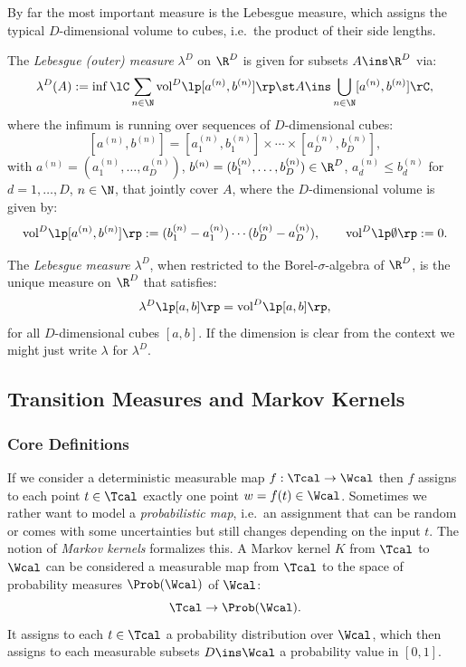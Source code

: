 By far the most important measure is the Lebesgue measure, which assigns the typical $D$-dimensional volume to cubes, i.e.\
the product of their side lengths.

\begin{Def}
    The \emph{Lebesgue (outer) measure} $\lambda^D$ on $\R^D$ is given for subsets $A \ins \R^D$ via:
    \[ \lambda^D(A) := \inf\lC \sum_{n \in \N} \mathrm{vol}^D\lp [a^{(n)},b^{(n)}] \rp  \st  
    A \ins \bigcup_{n \in \N} [a^{(n)},b^{(n)}]  \rC, \]
    where the infimum is running over sequences of $D$-dimensional cubes:
     \[ [a^{(n)},b^{(n)}] = [a_1^{(n)},b_1^{(n)}] \times \cdots \times [a_D^{(n)}, b_D^{(n)}],\]
  with $a^{(n)}=(a_1^{(n)},\dots,a_D^{(n)})$, $b^{(n)}=(b_1^{(n)},\dots,b_D^{(n)}) \in \R^D$, $a_d^{(n)} \le b_d^{(n)}$ for $d=1,\dots,D$, $n \in \N$, that jointly cover $A$, where the $D$-dimensional volume is given by:
  \[ \mathrm{vol}^D\lp [a^{(n)},b^{(n)}] \rp := (b_1^{(n)}-a_1^{(n)}) \cdots (b_D^{(n)}-a_D^{(n)}),\qquad \mathrm{vol}^D\lp \emptyset \rp :=0. \]
\end{Def}

\begin{Thm}
 The \emph{Lebesgue measure} $\lambda^D$, when restricted to the Borel-$\sigma$-algebra of $\R^D$,
  is the unique measure on $\R^D$ that satisfies:
    \[ \lambda^D\lp [a,b] \rp = \mathrm{vol}^D\lp [a,b] \rp,     \]
    for all $D$-dimensional cubes $[a,b]$.
    If the dimension is clear from the context we might just write $\lambda$ for $\lambda^D$.
\end{Thm}


\subsection{Transition Measures and Markov Kernels}

\subsubsection{Core Definitions}

\begin{Motivation}
 If we consider a deterministic measurable map $f: \Tcal \to \Wcal$ then $f$ assigns to each point $t \in \Tcal$ exactly one point $w=f(t) \in \Wcal$.
 Sometimes we rather want to model a \emph{probabilistic map}, i.e.\ an assignment that can be random or comes with some uncertainties but still changes depending on the input $t$. 
 The notion of \emph{Markov kernels} formalizes this. 
A Markov kernel $K$ from $\Tcal$ to $\Wcal$
can be considered  a measurable map from $\Tcal$ to the space of probability measures $\Prob(\Wcal)$ of $\Wcal$:
    \[ \Tcal \to \Prob(\Wcal).\]
 It assigns to each $t \in \Tcal$ a probability distribution over $\Wcal$, which then assigns to 
    each measurable subsets $D \ins \Wcal$ a probability value in $[0,1]$.
\end{Motivation}

